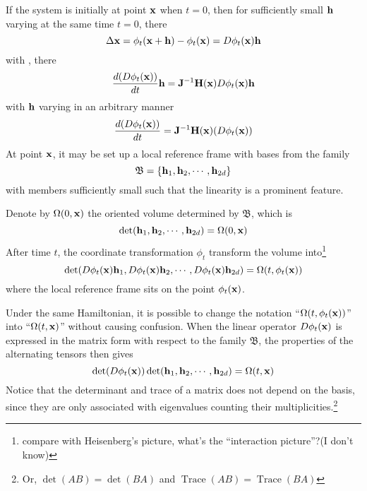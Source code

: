 If the system is initially at point $\mathbf{x}$ when $t=0$, then for sufficiently small $\mathbf{h}$ varying at the same time $t=0$, there
\[
    \Delta\mathbf{x}=\phi_t(\mathbf{x}+\mathbf{h})-\phi_t(\mathbf{x})=D\phi_t(\mathbf{x})\mathbf{h}
    \]
 with , there
 \begin{equation}\label{vhe2}
 \frac{d(D\phi_t(\mathbf{x}))}{dt}\mathbf{h}=\mathbf{J}^{-1}\mathbf{H}(\mathbf{x}) D\phi_t(\mathbf{x})\mathbf{h}
 \end{equation}
 with $\mathbf{h}$ varying in an arbitrary manner
 \begin{equation}\label{vhe2}
 \frac{d(D\phi_t(\mathbf{x}))}{dt}=\mathbf{J}^{-1}\mathbf{H}(\mathbf{x}) (D\phi_t(\mathbf{x}))
 \end{equation}
 At point $\mathbf{x}$, it may be set up a local reference frame with bases from the family
 \[
     \mathfrak B=\{\mathbf{h}_1, \mathbf{h}_2,\cdots ,\mathbf{h}_{2d}\}
     \]
with members sufficiently small such that the linearity is a prominent feature.

Denote by $\Omega(0,\mathbf{x})$ the oriented volume determined by $\mathfrak B$, which is
\[
    \det(\mathbf{h}_1, \mathbf{h}_2,\cdots ,\mathbf{h}_{2d})=\Omega(0,\mathbf{x})
    \] 
After time $t$, the coordinate transformation $\phi_t$ transform the volume into\footnote{compare with Heisenberg's picture, what's the ``interaction picture''?(I don't know)}
\[
    \det(D\phi_t(\mathbf{x})\mathbf{h}_1, D\phi_t(\mathbf{x})\mathbf{h}_2,\cdots ,D\phi_t(\mathbf{x})\mathbf{h}_{2d})=\Omega(t,\phi_t(\mathbf{x}))
    \]
where the local reference frame sits on the point $\phi_t(\mathbf{x})$.

Under the same Hamiltonian, it is possible to change the notation ``$\Omega(t,\phi_t(\mathbf{x}))$'' into ``$\Omega(t,\mathbf{x})$'' without causing confusion.
 When the linear operator $D\phi_t(\mathbf{x})$ is expressed in the matrix form with respect to the family $\mathfrak B$, the properties of the alternating tensors then gives
\begin{equation}\label{omega}
    \det(D\phi_t(\mathbf{x}))\det(\mathbf{h}_1, \mathbf{h}_2,\cdots ,\mathbf{h}_{2d})=\Omega(t, \mathbf{x})
\end{equation}
\def\trace{\operatorname{Trace}}
Notice that the determinant and trace of a matrix does not depend on the basis, since they are only associated with eigenvalues counting their multiplicities.\footnote{Or, $\det (AB)=\det (BA)$ and $\trace (AB)=\trace (BA)$}

